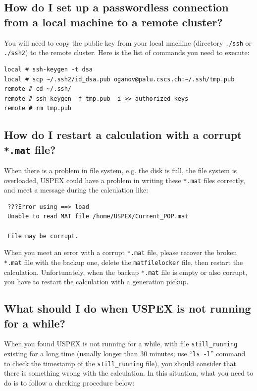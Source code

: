 \documentclass[12pt]{article}
\newcommand{\file}[1]{\texttt{#1}}
\begin{document}
\subsection{How do I set up a passwordless connection from a local machine to a
remote cluster?} \label{faq_passwordless}

You will need to copy the public key from your local machine (directory
\file{./ssh} or \file{./ssh2}) to the remote cluster.
Here is the list of commands you need to execute:

{\footnotesize
\begin{verbatim}
local # ssh-keygen -t dsa
local # scp ~/.ssh2/id_dsa.pub oganov@palu.cscs.ch:~/.ssh/tmp.pub
remote # cd ~/.ssh/
remote # ssh-keygen -f tmp.pub -i >> authorized_keys
remote # rm tmp.pub
\end{verbatim}
}

\subsection{How do I restart a calculation with a corrupt \file{*.mat} file?}
\label{faq_mat_files}

When there is a problem in file system, e.g. the disk is full, the file system
is overloaded, USPEX could have a problem in writing these \file{*.mat} files
correctly, and meet a message during the calculation like:

\begin{verbatim}
 ???Error using ==> load
 Unable to read MAT file /home/USPEX/Current_POP.mat
 
 File may be corrupt.
\end{verbatim}

When you meet an error with a corrupt \file{*.mat} file, please recover the
broken \file{*.mat} file with the backup one, delete the \file{matfilelocker}
file, then restart the calculation. Unfortunately, when the backup \file{*.mat}
file is empty or also corrupt, you have to restart the calculation with a
generation pickup.

\subsection{What should I do when USPEX is not running for a while?}
\label{faq_uspex_hang}

When you found USPEX is not running for a while, with file \file{still\_running}
existing for a long time (usually longer than 30 minutes; use ``\texttt{ls -l}''
command to check the timestamp of the \file{still\_running} file), you should
consider that there is something wrong with the calculation. In this situation,
what you need to do is to follow a checking procedure below:
\end{document}
